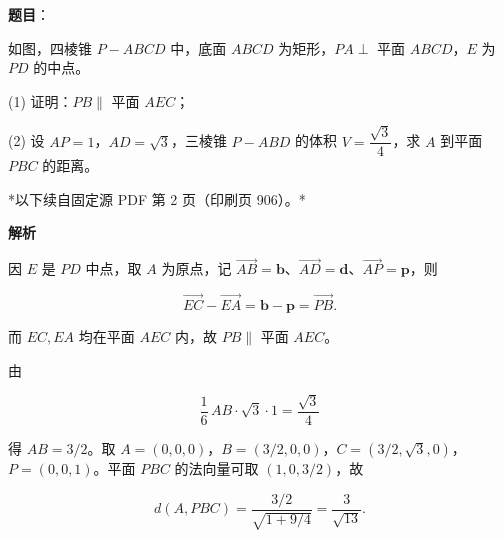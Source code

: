 \begin{answer}

\textbf{题目}：

如图，四棱锥 $P-ABCD$ 中，底面 $ABCD$ 为矩形，$PA\perp$ 平面 $ABCD$，$E$ 为 $PD$ 的中点。
\nopagebreak[4]
\begin{center}\end{center}
\nopagebreak[4]
(1) 证明：$PB\parallel$ 平面 $AEC$；

(2) 设 $AP=1$，$AD=\sqrt3$，三棱锥 $P-ABD$ 的体积 $V=\dfrac{\sqrt3}{4}$，求 $A$ 到平面 $PBC$ 的距离。

\par\medskip

*以下续自固定源 PDF 第 2 页（印刷页 906）。*

\textbf{解析}


因 $E$ 是 $PD$ 中点，取 $A$ 为原点，记 $\overrightarrow{AB}=\boldsymbol b$、$\overrightarrow{AD}=\boldsymbol d$、$\overrightarrow{AP}=\boldsymbol p$，则

\nopagebreak[4]
\[
\overrightarrow{EC}-\overrightarrow{EA}=\boldsymbol b-\boldsymbol p=\overrightarrow{PB}.
\]

而 $EC,EA$ 均在平面 $AEC$ 内，故 $PB\parallel$ 平面 $AEC$。


由

\nopagebreak[4]
\[
\frac16\,AB\cdot\sqrt3\cdot1=\frac{\sqrt3}{4}
\]

得 $AB=3/2$。取 $A=(0,0,0)$，$B=(3/2,0,0)$，$C=(3/2,\sqrt3,0)$，$P=(0,0,1)$。平面 $PBC$ 的法向量可取 $(1,0,3/2)$，故

\nopagebreak[4]
\[
d(A,PBC)=\frac{3/2}{\sqrt{1+9/4}}=\frac3{\sqrt{13}}.
\]



\end{answer}
